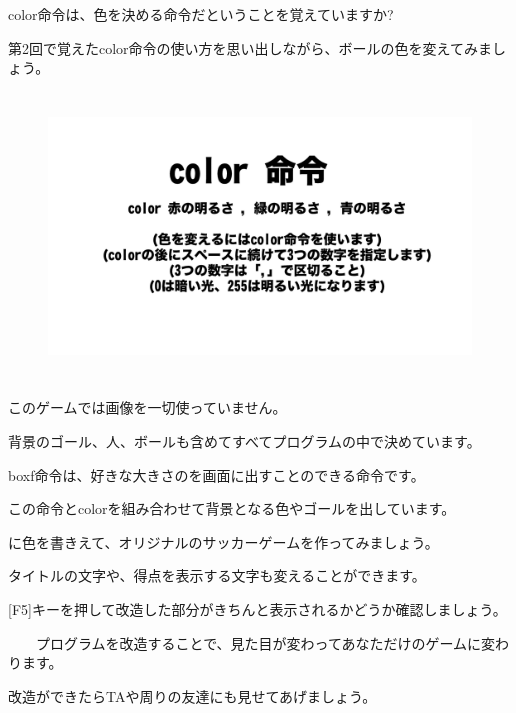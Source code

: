 color命令は、色を決める命令だということを覚えていますか?

第2回で覚えたcolor命令の使い方を思い出しながら、ボールの色を変えてみましょう。


\begin{figure}[H]
    \begin{center}
      \includegraphics[keepaspectratio,width=12.409cm,height=7.62cm]{text04-img/s_kicksrc3.png}
    \end{center}
    \label{fig:prog_menu}
\end{figure}


このゲームでは画像を一切使っていません。

背景のゴール、人、ボールも含めてすべてプログラムの中で決めています。

boxf命令は、好きな大きさのを画面に出すことのできる命令です。

この命令とcolorを組み合わせて背景となる色やゴールを出しています。



に色を書きえて、オリジナルのサッカーゲームを作ってみましょう。

タイトルの文字や、得点を表示する文字も変えることができます。




\begin{description}
    \item {}
\end{description}


[F5]キーを押して改造した部分がきちんと表示されるかどうか確認しましょう。

\ \ \ \ プログラムを改造することで、見た目が変わってあなただけのゲームに変わります。

改造ができたらTAや周りの友達にも見せてあげましょう。
\newpage
